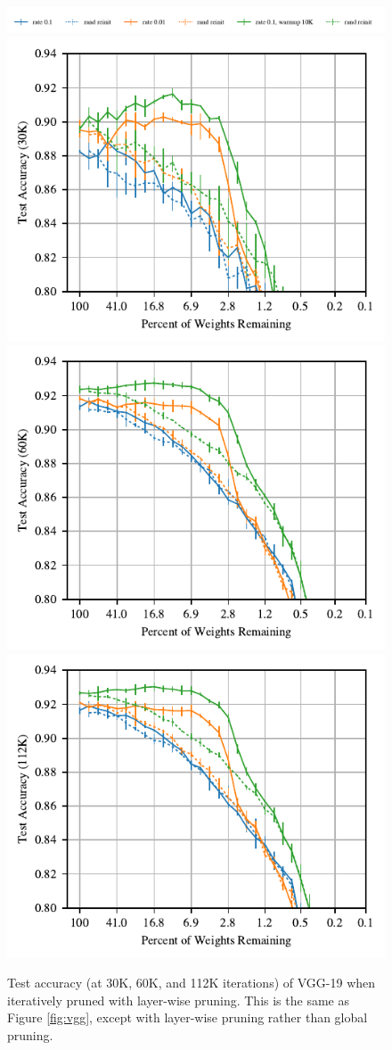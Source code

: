\begin{figure}
\centering
\vspace{-.5em}
\includegraphics[width=.7\textwidth]{graphs/cifar10/icml/vgg19-iclr-30000lw/legend}%
\vspace{-1em}
\includegraphics[width=.33\textwidth]{graphs/cifar10/icml/vgg19-iclr-30000lw/accuracy}%
\includegraphics[width=.33\textwidth]{graphs/cifar10/icml/vgg19-iclr-60000lw/accuracy}%
\includegraphics[width=.33\textwidth]{graphs/cifar10/icml/vgg19-iclr-112000lw/accuracy}%
\vspace{-1em}
\caption{Test accuracy (at 30K, 60K, and 112K iterations) of VGG-19 when iteratively pruned with layer-wise pruning. This is the same as Figure \ref{fig:vgg}, except with layer-wise pruning rather than global pruning.}
\label{fig:vgglw}
\end{figure}

